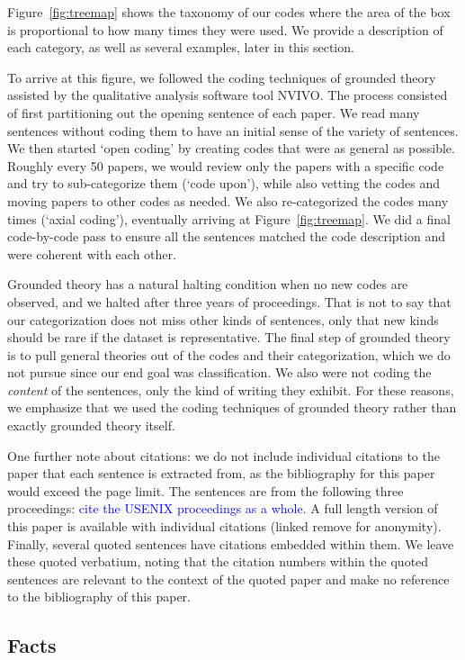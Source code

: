 \documentclass[sigconf,anonymous]{acmart}
\newcommand{\textblue}[1]{\textcolor{blue}{#1}}
\begin{document}
	Figure~\ref{fig:treemap} shows the taxonomy of our codes where the area of the box is proportional to how many times they were used. We provide a description of each category, as well as several examples, later in this section.
	
	To arrive at this figure, we followed the coding techniques of grounded theory assisted by the qualitative analysis software tool NVIVO. The process consisted of first partitioning out the opening sentence of each paper. We read many sentences without coding them to have an initial sense of the variety of sentences. We then started `open coding' by creating codes that were as general as possible. Roughly every 50 papers, we would review only the papers with a specific code and try to sub-categorize them (`code upon'), while also vetting the codes and moving papers to other codes as needed. We also re-categorized the codes many times (`axial coding'), eventually arriving at Figure~\ref{fig:treemap}. We did a final code-by-code pass to ensure all the sentences matched the code description and were coherent with each other. 
	
	Grounded theory has a natural halting condition when no new codes are observed, and we halted after three years of proceedings. That is not to say that our categorization does not miss other kinds of sentences, only that new kinds should be rare if the dataset is representative. The final step of grounded theory is to pull general theories out of the codes and their categorization, which we do not pursue since our end goal was classification. We also were not coding the \textit{content} of the sentences, only the kind of writing they exhibit. For these reasons, we emphasize that we used the coding techniques of grounded theory rather than exactly grounded theory itself. 
		
	One further note about citations: we do not include individual citations to the paper that each sentence is extracted from, as the bibliography for this paper would exceed the page limit. The sentences are from the following three proceedings: \textblue{cite the USENIX proceedings as a whole}. A full length version of this paper is available with individual citations (linked remove for anonymity). Finally, several quoted sentences have citations embedded within them. We leave these quoted verbatium, noting that the citation numbers within the quoted sentences are relevant to the context of the quoted paper and make no reference to the bibliography of this paper. 
	
	
	\subsection{Facts}
\end{document}
